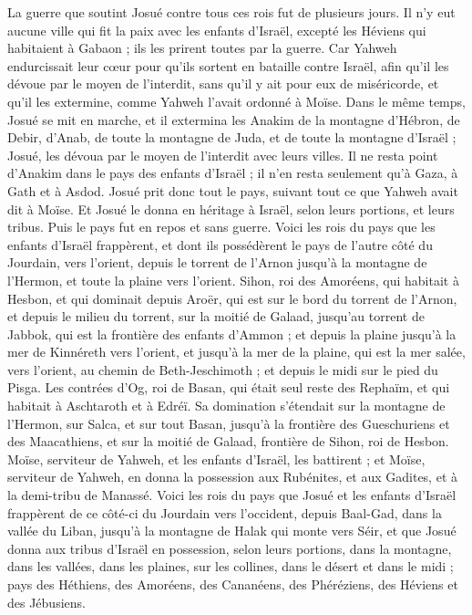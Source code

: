 \begin{multicols}{2}
La guerre que soutint Josué contre tous ces rois fut de plusieurs jours.
Il n’y eut aucune ville qui fit la paix avec les enfants d’Israël, excepté les Héviens qui habitaient à Gabaon ; ils les prirent toutes par la guerre.
Car Yahweh endurcissait leur cœur pour qu’ils sortent en bataille contre Israël, afin qu’il les dévoue par le moyen de l'interdit, sans qu’il y ait pour eux de miséricorde, et qu’il les extermine, comme Yahweh l’avait ordonné à Moïse.
Dans le même temps, Josué se mit en marche, et il extermina les Anakim de la montagne d’Hébron, de Debir, d’Anab, de toute la montagne de Juda, et de toute la montagne d’Israël ; Josué, les dévoua par le moyen de l'interdit avec leurs villes.
Il ne resta point d’Anakim dans le pays des enfants d’Israël ; il n’en resta seulement qu’à Gaza, à Gath et à Asdod.
Josué prit donc tout le pays, suivant tout ce que Yahweh avait dit à Moïse. Et Josué le donna en héritage à Israël, selon leurs portions, et leurs tribus. Puis le pays fut en repos et sans guerre.
\VerseOne{}Voici les rois du pays que les enfants d’Israël frappèrent, et dont ils possédèrent le pays de l’autre côté du Jourdain, vers l’orient, depuis le torrent de l’Arnon jusqu’à la montagne de l’Hermon, et toute la plaine vers l’orient.
Sihon, roi des Amoréens, qui habitait à Hesbon, et qui dominait depuis Aroër, qui est sur le bord du torrent de l’Arnon, et depuis le milieu du torrent, sur la moitié de Galaad, jusqu’au torrent de Jabbok, qui est la frontière des enfants d’Ammon ;
et depuis la plaine jusqu’à la mer de Kinnéreth vers l’orient, et jusqu’à la mer de la plaine, qui est la mer salée, vers l’orient, au chemin de Beth-Jeschimoth ; et depuis le midi sur le pied du Pisga.
Les contrées d’Og, roi de Basan, qui était seul reste des Rephaïm, et qui habitait à Aschtaroth et à Edréï.
Sa domination s’étendait sur la montagne de l’Hermon, sur Salca, et sur tout Basan, jusqu’à la frontière des Gueschuriens et des Maacathiens, et sur la moitié de Galaad, frontière de Sihon, roi de Hesbon.
Moïse, serviteur de Yahweh, et les enfants d’Israël, les battirent ; et Moïse, serviteur de Yahweh, en donna la possession aux Rubénites, et aux Gadites, et à la demi-tribu de Manassé.
Voici les rois du pays que Josué et les enfants d’Israël frappèrent de ce côté-ci du Jourdain vers l’occident, depuis Baal-Gad, dans la vallée du Liban, jusqu’à la montagne de Halak qui monte vers Séir, et que Josué donna aux tribus d’Israël en possession, selon leurs portions,
dans la montagne, dans les vallées, dans les plaines, sur les collines, dans le désert et dans le midi ; pays des Héthiens, des Amoréens, des Cananéens, des Phéréziens, des Héviens et des Jébusiens.

\end{multicols}
